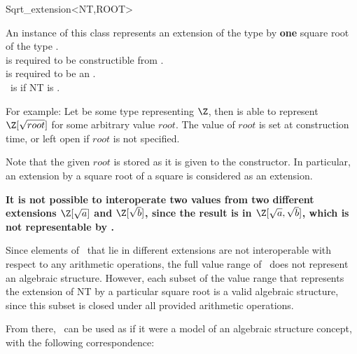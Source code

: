 
\begin{ccRefClass}{Sqrt_extension<NT,ROOT>}
\def\ccTagOperatorLayout{\ccFalse}

\ccDefinition

An instance of this class represents an extension of the type  by
\textbf{one} square root of the type . \\ 
 is required to be constructible from . \\
 is required to be an . \\
\ccRefName\ is  if NT is  .

For example: Let  be some type representing $\Z$, then 
 is able to represent $\Z[\sqrt{root}]$
for some arbitrary value $root$. The value of $root$ is set at 
construction time, or left open if $root$ is not specified.

Note that the given $root$ is stored as it is given to the constructor. In particular, an extension by a square root of a square is considered as an extension.  


\textbf {It is not possible to interoperate two values from two different 
extensions $\Z[\sqrt{a}]$ and $\Z[\sqrt{b}]$, since the result is in 
$\Z[\sqrt{a},\sqrt{b}]$, which is not representable by 
. }



\begin{ccAdvanced}
 Since elements of \ccRefName\ that lie in different extensions 
are not interoperable with respect to any arithmetic operations, the full
 value range of \ccRefName\ does not represent an algebraic structure.
 However, each subset of the value range that represents the extension of
 NT by a particular square root is a valid algebraic structure, since 
this subset is closed under all provided arithmetic  operations.

From there, \ccRefName\ can be used as if it were a model of an algebraic structure concept, with the following correspondence:


\end{ccAdvanced}
\end{ccRefClass}

